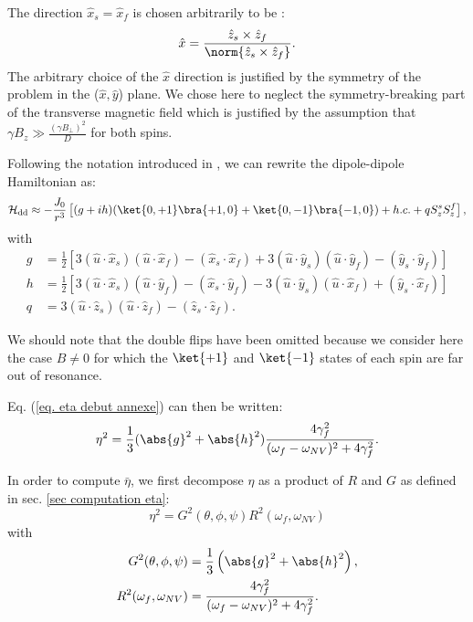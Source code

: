\documentclass[a4paper, 11pt]{report}
\begin{document}
The direction $\hat x_s=\hat x_f$ is chosen arbitrarily to be : $$\hat x=\frac{\hat z_s \times \hat z_f}{\norm{\hat z_s \times \hat z_f}}.$$
The arbitrary choice of the $\hat x$ direction is justified by the symmetry of the problem in the ($\hat x, \hat y$) plane. We chose here to neglect the symmetry-breaking part of the transverse magnetic field which is justified by the assumption that $\gamma B_z \gg \frac{(\gamma B_\perp)^2}{D}$ for both spins.

Following the notation introduced in \citep{choi2017depolarization}, we can rewrite the dipole-dipole Hamiltonian as:
\begin{equation}
\mathcal{H}_{\rm dd} \approx -\frac{J_0}{r^3}\left[(g+ih)(\ket{0,+1}\bra{+1,0}+\ket{0,-1}\bra{-1,0}) + h.c. + q S_z^sS_z^f \right],
\end{equation}
with 
\begin{align}
g&=\frac{1}{2}\left[3(\hat{u}\cdot\hat{x}_s)(\hat{u}\cdot\hat{x}_f) - (\hat{x}_s \cdot \hat{x}_f) + 3(\hat{u}\cdot\hat{y}_s)(\hat{u}\cdot\hat{y}_f) - (\hat{y}_s \cdot \hat{y}_f) \right] \\
h&=\frac{1}{2}\left[3(\hat{u}\cdot\hat{x}_s)(\hat{u}\cdot\hat{y}_f) - (\hat{x}_s \cdot \hat{y}_f) - 3(\hat{u}\cdot\hat{y}_s)(\hat{u}\cdot\hat{x}_f) + (\hat{y}_s \cdot \hat{x}_f) \right] \\
q&= 3(\hat{u}\cdot \hat{z}_s)(\hat{u}\cdot \hat{z}_f) - (\hat{z}_s \cdot \hat{z}_f).
\end{align}

We should note that the double flips have been omitted because we consider here the case $B\neq0$ for which the $\ket{+1}$ and $\ket{-1}$ states of each spin are far out of resonance.

Eq. (\ref{eq. eta debut annexe}) can then be written:
\begin{equation}
\eta^2=\frac{1}{3} (\abs{g}^2 + \abs{h}^2) \frac{4\gamma_f^2}{(\omega_f - \omega_{NV})^2+4\gamma_f^2}.
\end{equation}

In order to compute $\bar \eta$, we first decompose $\eta$ as a product of $R$ and $G$ as defined in sec. \ref{sec computation eta}:
\begin{equation}
\eta^2=G^2(\theta, \phi, \psi) R^2(\omega_f,\omega_{NV})
\end{equation}
with
\begin{align*}
G^2(\theta, \phi, \psi)&=\frac{1}{3}\left(\abs{g}^2+\abs{h}^2 \right), \\ 
R^2(\omega_f,\omega_{NV}) &= \frac{4\gamma_f^2}{(\omega_f - \omega_{NV})^2+4\gamma_f^2}.
\end{align*}
\end{document}
